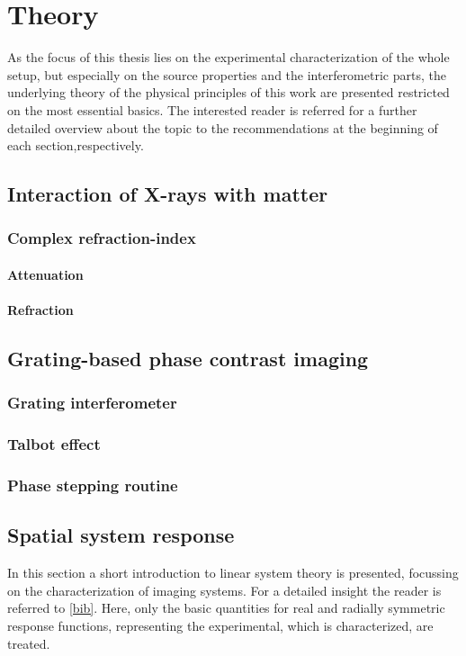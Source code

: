 \chapter{Theory}\label{chap:th}
\noindent As the focus of this thesis lies on the experimental characterization of the whole setup, 
but especially on the source properties and the interferometric parts, 
the underlying theory of the physical principles of this work are presented restricted on the most essential basics.
The interested reader is referred for a further detailed overview about the topic to the recommendations at the beginning of each section,respectively.
\section{Interaction of X-rays with matter}\label{sec:ixm}
\subsection{Complex refraction-index}\label{subsec:cri}
\subsubsection{Attenuation}\label{subsec:att}
\subsubsection{Refraction}\label{subsec:ref}
\section{Grating-based phase contrast imaging}\label{sec:phase}
\subsection{Grating interferometer}\label{subsec:gi}
\subsection{Talbot effect}\label{te}
\subsection{Phase stepping routine}\label{subsec:stepp}







\section{Spatial system response} \label{sec:ssr}
\noindent In this section a short introduction to linear system theory is presented, 
focussing on the characterization of imaging systems. For a detailed insight the reader is referred to \ref{bib}. 
Here, only the basic quantities for real and radially symmetric response functions, representing the experimental, which is characterized, are treated.   
